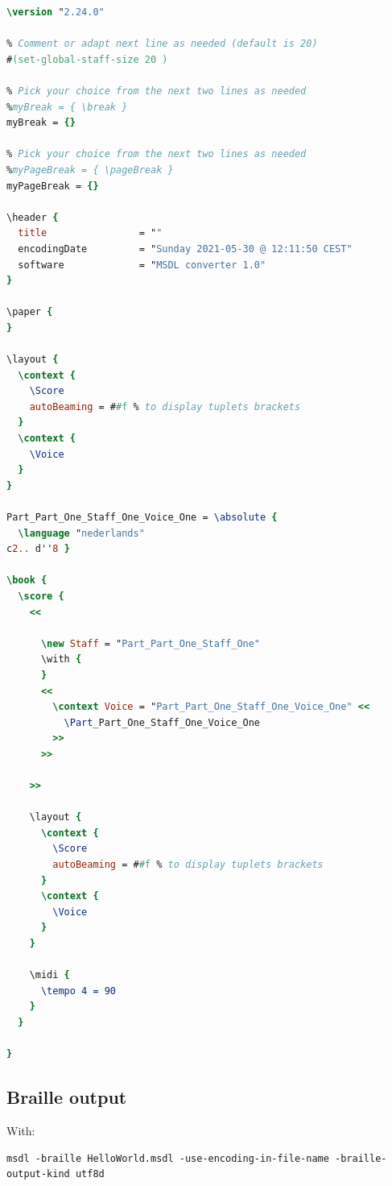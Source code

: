 \begin{lstlisting}[language=Lilypond]
\version "2.24.0"

% Comment or adapt next line as needed (default is 20)
#(set-global-staff-size 20 )

% Pick your choice from the next two lines as needed
%myBreak = { \break }
myBreak = {}

% Pick your choice from the next two lines as needed
%myPageBreak = { \pageBreak }
myPageBreak = {}

\header {
  title                = ""
  encodingDate         = "Sunday 2021-05-30 @ 12:11:50 CEST"
  software             = "MSDL converter 1.0"
}

\paper {
}

\layout {
  \context {
    \Score
    autoBeaming = ##f % to display tuplets brackets
  }
  \context {
    \Voice
  }
}

Part_Part_One_Staff_One_Voice_One = \absolute {
  \language "nederlands"
c2.. d''8 }

\book {
  \score {
    <<

      \new Staff = "Part_Part_One_Staff_One"
      \with {
      }
      <<
        \context Voice = "Part_Part_One_Staff_One_Voice_One" <<
          \Part_Part_One_Staff_One_Voice_One
        >>
      >>

    >>

    \layout {
      \context {
        \Score
        autoBeaming = ##f % to display tuplets brackets
      }
      \context {
        \Voice
      }
    }

    \midi {
      \tempo 4 = 90
    }
  }

}
\end{lstlisting}

\subsection{Braille output}

With:
\begin{lstlisting}[language=Terminal]
msdl -braille HelloWorld.msdl -use-encoding-in-file-name -braille-output-kind utf8d
\end{lstlisting}

